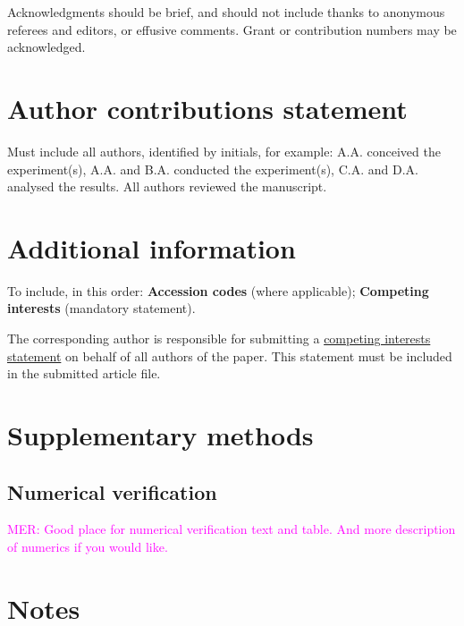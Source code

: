 \documentclass[fleqn,10pt]{wlscirep}
\newcommand{\mer}[1]{\textcolor{magenta}{#1}}
\begin{document}
Acknowledgments should be brief, and should not include thanks to anonymous referees and editors, or effusive comments. Grant or contribution numbers may be acknowledged.

\section*{Author contributions statement}

Must include all authors, identified by initials, for example:
A.A. conceived the experiment(s),  A.A. and B.A. conducted the experiment(s), C.A. and D.A. analysed the results.  All authors reviewed the manuscript. 

\section*{Additional information}

To include, in this order: \textbf{Accession codes} (where applicable); \textbf{Competing interests} (mandatory statement). 

The corresponding author is responsible for submitting a \href{http://www.nature.com/srep/policies/index.html#competing}{competing interests statement} on behalf of all authors of the paper. This statement must be included in the submitted article file.


\newpage
\appendix

\section{Supplementary methods}

\subsection{Numerical verification}

\mer{MER: Good place for numerical verification text and table. And more description of numerics if you would like.}


\newpage
\section{Notes}
\end{document}
